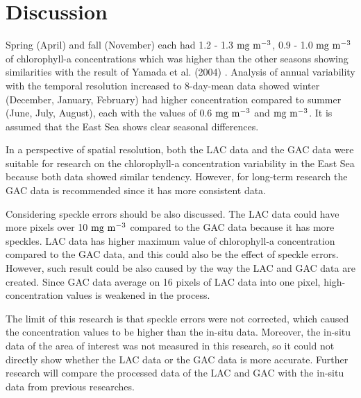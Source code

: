 \section{Discussion}

Spring (April) and fall (November) each had 1.2 - 1.3 $\rm mg~m^{-3}$, 0.9 - 1.0 $\rm mg~m^{-3}$ of chlorophyll-a concentrations which was higher than the other seasons showing similarities with the result of Yamada et al. (2004) \cite{yamada2004seasonal}. Analysis of annual variability with the temporal resolution increased to 8-day-mean data showed winter (December, January, February) had higher concentration compared to summer (June, July, August), each with the values of 0.6 $\rm mg~m^{-3}$ and $\rm mg~m^{-3}$. It is assumed that the East Sea shows clear seasonal differences.

In a perspective of spatial resolution, both the LAC data and the GAC data were suitable for research on the chlorophyll-a concentration variability in the East Sea because both data showed similar tendency. However, for long-term research the GAC data is recommended since it has more consistent data. 

Considering speckle errors should be also discussed. The LAC data could have more pixels over 10 $\rm mg~m^{-3}$ compared to the GAC data because it has more speckles. LAC data has higher maximum value of chlorophyll-a concentration compared to the GAC data, and this could also be the effect of speckle errors. However, such result could be also caused by the way the LAC and GAC data are created. Since GAC data average on 16 pixels of LAC data into one pixel, high-concentration values is weakened in the process. 

The limit of this research is that speckle errors were not corrected, which caused the concentration values to be higher than the in-situ data. Moreover, the in-situ data of the area of interest was not measured in this research, so it could not directly show whether the LAC data or the GAC data is more accurate. Further research will compare the processed data of the LAC and GAC with the in-situ data from previous researches.

